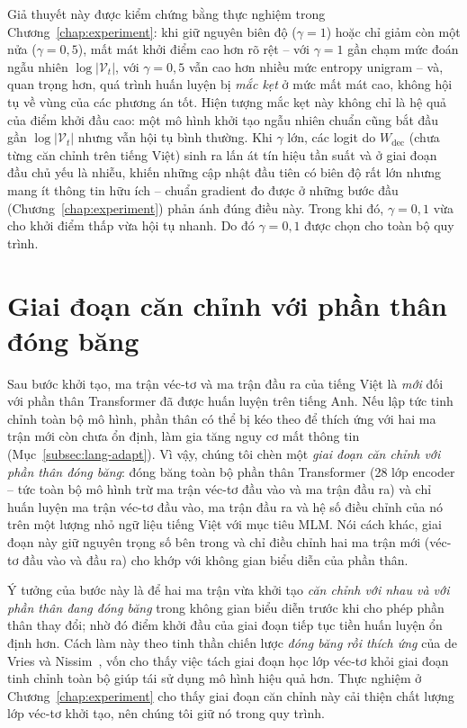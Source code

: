 Giả thuyết này được kiểm chứng bằng thực nghiệm trong Chương~\ref{chap:experiment}: khi giữ
nguyên biên độ ($\gamma = 1$) hoặc chỉ giảm còn một nửa ($\gamma = 0{,}5$), mất mát khởi điểm cao
hơn rõ rệt -- với $\gamma=1$ gần chạm mức đoán ngẫu nhiên $\log|\mathcal{V}_t|$, với $\gamma=0{,}5$
vẫn cao hơn nhiều mức entropy unigram -- và, quan trọng hơn, quá trình huấn
luyện bị \textit{mắc kẹt} ở mức mất mát cao, không hội tụ về vùng của các phương án tốt.
Hiện tượng mắc kẹt này không chỉ là hệ quả của điểm khởi đầu cao: một mô hình khởi tạo ngẫu
nhiên chuẩn cũng bắt đầu gần $\log|\mathcal{V}_t|$ nhưng vẫn hội tụ bình thường. Khi $\gamma$
lớn, các logit do $W_{\mathrm{dec}}$ (chưa từng căn chỉnh trên tiếng Việt) sinh ra lấn át tín
hiệu tần suất và ở giai đoạn đầu chủ yếu là nhiễu, khiến những cập nhật đầu tiên có biên độ
rất lớn nhưng mang ít thông tin hữu ích -- chuẩn gradient đo được ở những bước đầu
(Chương~\ref{chap:experiment}) phản ánh đúng điều này.
Trong khi đó, $\gamma = 0{,}1$ vừa cho khởi điểm thấp vừa hội tụ nhanh. Do đó $\gamma = 0{,}1$
được chọn cho toàn bộ quy trình.

\section{Giai đoạn căn chỉnh với phần thân đóng băng}
\label{sec:freeze}

Sau bước khởi tạo, ma trận véc-tơ và ma trận đầu ra của tiếng Việt là \textit{mới} đối với
phần thân Transformer đã được huấn luyện trên tiếng Anh. Nếu lập tức tinh chỉnh toàn bộ mô
hình, phần thân có thể bị kéo theo để thích ứng với hai ma trận mới còn chưa ổn định, làm gia
tăng nguy cơ mất thông tin (Mục~\ref{subsec:lang-adapt}). Vì vậy, chúng tôi chèn một
\textit{giai đoạn căn chỉnh với phần thân đóng băng}: đóng băng toàn bộ phần thân Transformer (28 lớp
encoder -- tức toàn bộ mô hình trừ ma trận véc-tơ đầu vào và ma trận đầu ra) và chỉ huấn
luyện ma trận véc-tơ đầu vào, ma trận đầu ra và hệ số điều chỉnh của nó trên một lượng nhỏ ngữ liệu
tiếng Việt với mục tiêu MLM. Nói cách khác, giai đoạn này giữ nguyên trọng số bên trong và
chỉ điều chỉnh hai ma trận mới (véc-tơ đầu vào và đầu ra) cho khớp với không gian biểu diễn của phần thân.

Ý tưởng của bước này là để hai ma trận vừa khởi tạo \textit{căn chỉnh với nhau và với phần
thân đang đóng băng} trong không gian biểu diễn trước khi cho phép phần thân thay đổi; nhờ đó điểm
khởi đầu của giai đoạn tiếp tục tiền huấn luyện ổn định hơn. Cách làm này theo tinh thần
chiến lược \textit{đóng băng rồi thích ứng} của de Vries và
Nissim~\cite{devries2021recycle}, vốn cho thấy việc tách giai đoạn học lớp véc-tơ khỏi giai
đoạn tinh chỉnh toàn bộ giúp tái sử dụng mô hình hiệu quả hơn. Thực nghiệm ở
Chương~\ref{chap:experiment} cho thấy giai đoạn căn chỉnh này cải thiện
chất lượng lớp véc-tơ khởi tạo, nên chúng tôi giữ nó trong quy trình.
